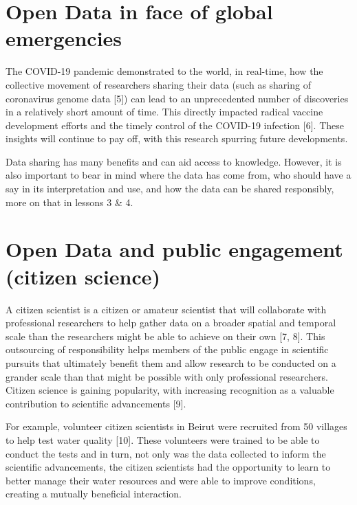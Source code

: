 \documentclass[
  letterpaper,
  DIV=11,
  numbers=noendperiod]{scrreport}
\begin{document}
\hypertarget{open-data-in-face-of-global-emergencies}{%
\section{Open Data in face of global
emergencies}\label{open-data-in-face-of-global-emergencies}}

The COVID-19 pandemic demonstrated to the world, in real-time, how the
collective movement of researchers sharing their data (such as sharing
of coronavirus genome data {[}5{]}) can lead to an unprecedented number
of discoveries in a relatively short amount of time. This directly
impacted radical vaccine development efforts and the timely control of
the COVID-19 infection {[}6{]}. These insights will continue to pay off,
with this research spurring future developments.

Data sharing has many benefits and can aid access to knowledge. However,
it is also important to bear in mind where the data has come from, who
should have a say in its interpretation and use, and how the data can be
shared responsibly, more on that in lessons 3 \& 4.

\hypertarget{open-data-and-public-engagement-citizen-science}{%
\section{Open Data and public engagement (citizen
science)}\label{open-data-and-public-engagement-citizen-science}}

A citizen scientist is a citizen or amateur scientist that will
collaborate with professional researchers to help gather data on a
broader spatial and temporal scale than the researchers might be able to
achieve on their own {[}7, 8{]}. This outsourcing of responsibility
helps members of the public engage in scientific pursuits that
ultimately benefit them and allow research to be conducted on a grander
scale than that might be possible with only professional researchers.
Citizen science is gaining popularity, with increasing recognition as a
valuable contribution to scientific advancements {[}9{]}.

For example, volunteer citizen scientists in Beirut were recruited from
50 villages to help test water quality {[}10{]}. These volunteers were
trained to be able to conduct the tests and in turn, not only was the
data collected to inform the scientific advancements, the citizen
scientists had the opportunity to learn to better manage their water
resources and were able to improve conditions, creating a mutually
beneficial interaction.
\end{document}
